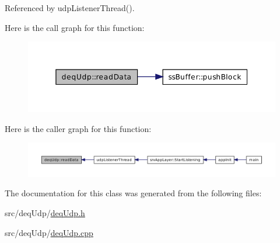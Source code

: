 Referenced by udpListenerThread().



Here is the call graph for this function:\nopagebreak
\begin{figure}[H]
\begin{center}
\leavevmode
\includegraphics[width=352pt]{db/dc2/classdeqUdp_afd4705cd64f0f137d1f36860761f4865_cgraph}
\end{center}
\end{figure}




Here is the caller graph for this function:\nopagebreak
\begin{figure}[H]
\begin{center}
\leavevmode
\includegraphics[width=400pt]{db/dc2/classdeqUdp_afd4705cd64f0f137d1f36860761f4865_icgraph}
\end{center}
\end{figure}




The documentation for this class was generated from the following files:\begin{DoxyCompactItemize}
\item 
src/deqUdp/\hyperlink{deqUdp_8h}{deqUdp.h}\item 
src/deqUdp/\hyperlink{deqUdp_8cpp}{deqUdp.cpp}\end{DoxyCompactItemize}
